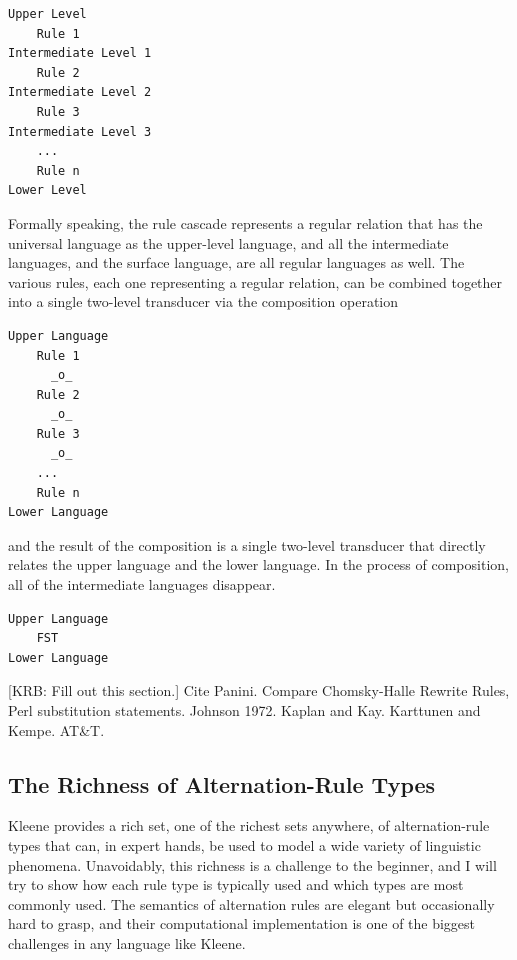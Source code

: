 \begin{Verbatim}
Upper Level
    Rule 1
Intermediate Level 1
    Rule 2
Intermediate Level 2
    Rule 3
Intermediate Level 3
    ...
    Rule n
Lower Level
\end{Verbatim}

\noindent
Formally speaking, the rule cascade represents a regular relation that
has the universal language as
the upper-level language, and all the intermediate languages, and the surface language, are all regular
languages as well.  The various rules, each one representing a regular relation, can be combined
together into a single two-level transducer via the composition operation

\begin{samepage}
\begin{Verbatim}
Upper Language
    Rule 1
      _o_
    Rule 2
      _o_
    Rule 3
      _o_
    ...
    Rule n
Lower Language
\end{Verbatim}
\end{samepage}

\noindent
and the result of the composition is a single two-level transducer that directly relates the upper
language and the lower language.  In the process of composition, all of the intermediate languages disappear.

\begin{Verbatim}
Upper Language
	FST
Lower Language
\end{Verbatim}


[KRB:  Fill out this section.]  Cite Panini.  Compare Chomsky-Halle Rewrite Rules, Perl substitution statements.
Johnson 1972.  Kaplan and Kay.  Karttunen and Kempe.  AT\&T.


\subsection{The Richness of Alternation-Rule Types}

Kleene provides a rich set, one of the richest sets anywhere, of alternation-rule types
that can, in expert hands, be used to model a wide variety of linguistic phenomena.
Unavoidably, this richness is a challenge to the beginner, and I will try to show how
each rule type is typically used and which types are most commonly used.  The semantics
of alternation rules are elegant but occasionally hard to grasp, and their computational
implementation is one of the biggest challenges in any language like Kleene.

